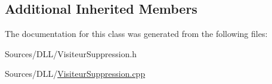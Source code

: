\subsection*{Additional Inherited Members}


The documentation for this class was generated from the following files\+:\begin{DoxyCompactItemize}
\item 
Sources/\+D\+L\+L/Visiteur\+Suppression.\+h\item 
Sources/\+D\+L\+L/\hyperlink{_visiteur_suppression_8cpp}{Visiteur\+Suppression.\+cpp}\end{DoxyCompactItemize}
